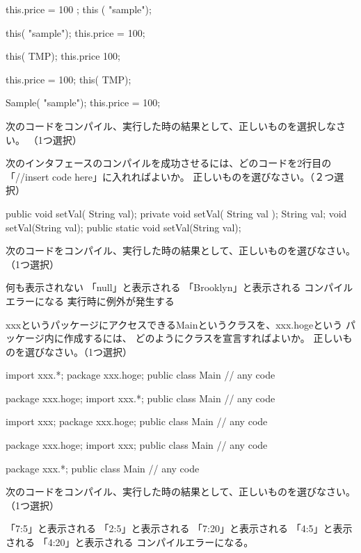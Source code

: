 \documentclass{jarticle}
\begin{document}

this.price = 100 ;
this ( "sample");

this( "sample");
this.price = 100;

this( TMP);
this.price  100;

this.price = 100;
this( TMP);

Sample( "sample");
this.price = 100;


次のコードをコンパイル、実行した時の結果として、正しいものを選択しなさい。
（1つ選択）


次のインタフェースのコンパイルを成功させるには、どのコードを2行目の「//insert code here」に入れればよいか。
正しいものを選びなさい。（２つ選択）


public void setVal( String val);
private void setVal( String val );
String val;
void setVal(String val);
public static void setVal(String val);


次のコードをコンパイル、実行した時の結果として、正しいものを選びなさい。
（1つ選択）


何も表示されない
「null」と表示される
「Brooklyn」と表示される
コンパイルエラーになる
実行時に例外が発生する


xxxというパッケージにアクセスできるMainというクラスを、xxx.hogeという
パッケージ内に作成するには、
どのようにクラスを宣言すればよいか。
正しいものを選びなさい。（1つ選択）

import xxx.*;
package xxx.hoge;
public class Main {
    // any code
}

package xxx.hoge;
import xxx.*;
public class Main{
    // any code
}

import xxx;
package xxx.hoge;
public class Main{
    // any code
}

package xxx.hoge;
import xxx;
public  class Main{
    // any code
}

package xxx.*;
public class Main{
    // any code
}


次のコードをコンパイル、実行した時の結果として、正しいものを選びなさい。
（1つ選択）


「7:5」と表示される
「2:5」と表示される
「7:20」と表示される
「4:5」と表示される
「4:20」と表示される
コンパイルエラーになる。
\end{document}

